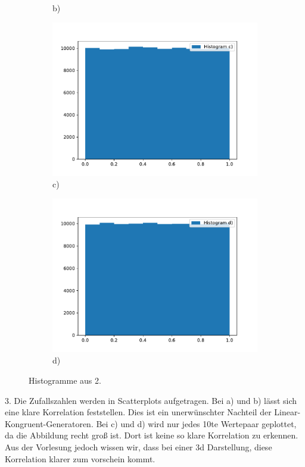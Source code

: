 \begin{figure}
\begin{subfigure}[b]{0.5\textwidth}
        \caption{b)}
      \end{subfigure}
      \begin{subfigure}[b]{0.5\textwidth}
        \includegraphics[width=\textwidth]{images/c.pdf}
        \caption{c)}
      \end{subfigure}
      \begin{subfigure}[b]{0.5\textwidth}
        \includegraphics[width=\textwidth]{images/d.pdf}
        \caption{d)}
      \end{subfigure}
      \caption{Histogramme aus 2.}
      \label{fig:2}
    \end{figure}

    3. Die Zufallszahlen werden in Scatterplots aufgetragen. Bei a) und b) lässt sich eine klare Korrelation feststellen. 
    Dies ist ein unerwünschter Nachteil der Linear-Kongruent-Generatoren.
    Bei c) und d) wird nur jedes 10te Wertepaar geplottet, da die Abbildung recht groß ist. Dort ist keine so klare Korrelation zu erkennen.
    Aus der Vorlesung jedoch wissen wir, dass bei einer 3d Darstellung, diese Korrelation klarer zum vorschein kommt.
    

